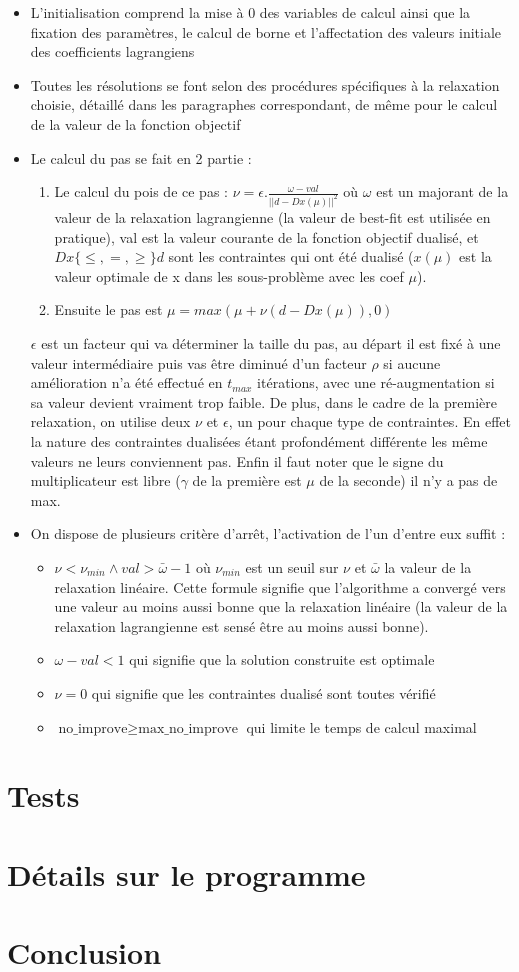 \documentclass{article}
\begin{document}
\begin{itemize}
\item
L'initialisation comprend la mise à 0 des variables de calcul ainsi que la fixation des paramètres, le calcul de borne et l'affectation des valeurs initiale des coefficients lagrangiens
\item
Toutes les résolutions se font selon des procédures spécifiques à la relaxation choisie, détaillé dans les paragraphes correspondant, de même pour le calcul de la valeur de la fonction objectif
\item
Le calcul du pas se fait en 2 partie :
\begin{enumerate}[1 - ]
\item
Le calcul du pois de ce pas : $\nu = \epsilon . \frac{\omega - val}{||d - Dx(\mu)||^2}$ où $\omega$ est un majorant de la valeur de la relaxation lagrangienne (la valeur de best-fit est utilisée en pratique), val est la valeur courante de la fonction objectif dualisé, et $Dx \{\leqslant, =, \geqslant\} d$ sont les contraintes qui ont été dualisé ($x(\mu)$ est la valeur optimale de x dans les sous-problème avec les coef $\mu$).
\item
Ensuite le pas est $\mu = max(\mu + \nu ( d - Dx(\mu)), 0)$
\end{enumerate}
$\epsilon$ est un facteur qui va déterminer la taille du pas, au départ il est fixé à une valeur intermédiaire puis vas être diminué d'un facteur $\rho$ si aucune amélioration n'a été effectué en $t_{max}$ itérations, avec une ré-augmentation si sa valeur devient vraiment trop faible. De plus, dans le cadre de la première relaxation, on utilise deux $\nu$ et $\epsilon$, un pour chaque type de contraintes. En effet la nature des contraintes dualisées étant profondément différente les même valeurs ne leurs conviennent pas. Enfin il faut noter que le signe du multiplicateur est libre ($\gamma$ de la première est $\mu$ de la seconde)  il n'y a pas de max.
\item
On dispose de plusieurs critère d’arrêt, l'activation de l'un d'entre eux suffit :
\begin{itemize}
\item
$\nu < \nu_{min} \land val > \bar{\omega} -1$ où $\nu_{min}$ est un seuil sur $\nu$ et $\bar{\omega}$ la valeur de la relaxation linéaire. Cette formule signifie que l'algorithme a convergé vers une valeur au moins aussi bonne que la relaxation linéaire (la valeur de la relaxation lagrangienne est sensé être au moins aussi bonne).
\item
$\omega - val < 1$ qui signifie que la solution construite est optimale
\item
$\nu = 0$ qui signifie que les contraintes dualisé sont toutes vérifié
\item
$\text{no\_improve} \geqslant \text{max\_no\_improve}$ qui limite le temps de calcul maximal
\end{itemize}
\end{itemize}

\section{Tests}

\section{Détails sur le programme}

\section{Conclusion}
\end{document}
